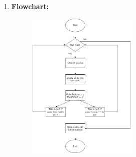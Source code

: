 \documentclass[11pt,a4paper]{article}
\begin{document}
{\begin{enumerate}[label=\textbf{\arabic*})]
\begin{algorithm}
\begin{algorithmic}[1]
            			\State set end as pivotIndex
            			\State pIndex = beg - 1
            					\State Swap a[i] and a[pIndex]
            					\State pIndex++
            				\EndIf
            			\EndFor
            			\State Swap pivot and a[pIndex + 1]
            			\State return pIndex + 1
            		\EndProcedure
            	\end{algorithmic}
            \end{algorithm}
				\item \textbf{Flowchart:}
					\begin{figure}[H]
						\centering 
						\includegraphics[width=0.5\textwidth]{QuickSortFlowChart}
					\end{figure}
					

\end{enumerate}}
\end{document}
